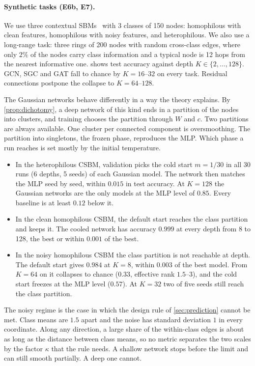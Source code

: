\documentclass[10pt]{article}
\theoremstyle{definition}
\theoremstyle{remark}
\begin{document}
\paragraph{Synthetic tasks (E6b, E7).} We use three contextual SBMs~\citep{deshpande2018} with 3 classes of 150 nodes: homophilous with
clean features, homophilous with noisy features, and heterophilous. We also use a long-range task: three rings of 200 nodes with random
cross-class edges, where only $2\%$ of the nodes carry class information and a typical node is 12 hops from the nearest informative one.
 shows test accuracy against depth $K\in\{2,\dots,128\}$. GCN, SGC and GAT fall to chance by $K=16$--$32$ on
every task. Residual connections postpone the collapse to $K=64$--$128$.

The Gaussian networks behave differently in a way the theory explains. By \cref{prop:dichotomy}, a deep network of this kind ends in a
partition of the nodes into clusters, and training chooses the partition through $W$ and $c$. Two partitions are always available.
One cluster per connected component is oversmoothing. The partition into singletons, the frozen phase, reproduces the MLP. Which phase a
run reaches is set mostly by the initial temperature.
\begin{itemize}
\item In the heterophilous CSBM, validation picks the cold start $m=1/30$ in all 30 runs (6 depths, 5 seeds) of each Gaussian model. The
network then matches the MLP seed by seed, within $0.015$ in test accuracy. At $K=128$ the Gaussian networks are the only models at the MLP level of
$0.85$. Every baseline is at least $0.12$ below it.
\item In the clean homophilous CSBM, the default start reaches the class partition and keeps it. The cooled network has accuracy $0.999$
at every depth from 8 to 128, the best or within $0.001$ of the best.
\item In the noisy homophilous CSBM the class partition is not reachable at depth. The default start gives $0.984$ at $K=8$, within
$0.003$ of the best model. From $K=64$ on it collapses to chance ($0.33$, effective rank $1.5$--$3$), and the cold start freezes at the MLP
level ($0.57$). At $K=32$ two of five seeds still reach the class partition.
\end{itemize}
The noisy regime is the case in which the design rule of \cref{sec:prediction} cannot be met. Class means are $1.5$ apart and the noise
has standard deviation $1$ in every coordinate. Along any direction, a large share of the within-class edges is about as long as the
distance between class means, so no metric separates the two scales by the factor $\kappa$ that the rule needs. A shallow network stops before the limit and can still smooth partially. A deep one cannot.
\end{document}
